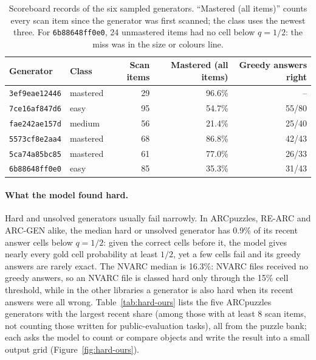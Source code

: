 \documentclass[11pt]{article}
\newcommand{\gen}[1]{\texttt{#1}}
\begin{document}
\begin{table}[H]
\centering
\small
\begin{tabular}{llrrr}
\toprule
Generator & Class & Scan items & Mastered (all items) & Greedy answers right \\
\midrule
\gen{3ef9eae12446} & mastered & 29 & 96.6\% & -- \\
\gen{7ce16af847d6} & easy & 95 & 54.7\% & 55/80 \\
\gen{fae242ae157d} & medium & 56 & 21.4\% & 25/40 \\
\gen{5573cf8e2aa4} & mastered & 68 & 86.8\% & 42/43 \\
\gen{5ca74a85bc85} & mastered & 61 & 77.0\% & 26/33 \\
\gen{6b88648ff0e0} & easy & 85 & 35.3\% & 31/43 \\
\bottomrule
\end{tabular}
\caption{Scoreboard records of the six sampled generators. ``Mastered (all
items)'' counts every scan item since the generator was first scanned; the class
uses the newest three. For \gen{6b88648ff0e0}, 24 unmastered items had no cell
below $q=1/2$: the miss was in the size or colours line.}
\end{table}

\paragraph{What the model found hard.} Hard and unsolved generators usually
fail narrowly. In ARCpuzzles, RE-ARC and ARC-GEN alike, the median hard or
unsolved generator has 0.9\% of its recent answer cells below $q=1/2$: given
the correct cells before it, the model gives nearly every gold cell
probability at least $1/2$, yet a few cells fail and its greedy answers are
rarely exact. The NVARC median is 16.3\%: NVARC files received no greedy
answers, so an NVARC file is classed hard only through the 15\% cell
threshold, while in the other libraries a generator is also hard when its
recent answers were all wrong. Table~\ref{tab:hard-ours} lists the five
ARCpuzzles generators with the largest recent share (among those with at least
8 scan items, not counting those written for public-evaluation tasks), all from
the puzzle bank;
each asks the model to count or compare objects and write the result into a
small output grid (Figure~\ref{fig:hard-ours}).
\end{document}
